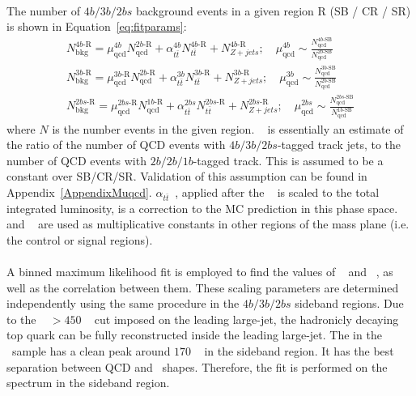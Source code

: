 \paragraph{}
The number of $4b/3b/2bs$ background events in a given region R (SB / CR / SR) is shown in Equation~\ref{eq:fitparams}:
\begin{eqnarray}
\label{eq:fitparams}
N^{4b\text{-R}}_{\text{bkg}} = \mu_{\text{qcd}}^{4b} N^{2b\text{-R}}_{\text{qcd}} + \alpha_{t\bar{t}}^{4b} N^{4b\text{-R}}_{t\bar{t}} + N^{4b\text{-R}}_{Z+jets};
\quad \mu_{\text{qcd}}^{4b} \sim \frac{N^{4b\text{-SB}}_{\text{qcd}}}{N^{2b\text{-SB}}_{\text{qcd}}}
\\
N^{3b\text{-R}}_{\text{bkg}} = \mu_{\text{qcd}}^{3b\text{-R}} N^{2b\text{-R}}_{\text{qcd}} + \alpha_{t\bar{t}}^{3b} N^{3b\text{-R}}_{t\bar{t}} + N^{3b\text{-R}}_{Z+jets} ;
\quad \mu_{\text{qcd}}^{3b} \sim \frac{N^{3b\text{-SB}}_{\text{qcd}}}{N^{2b\text{-SB}}_{\text{qcd}}}\\
N^{2bs\text{-R}}_{\text{bkg}} = \mu_{\text{qcd}}^{2bs\text{-R}} N^{1b\text{-R}}_{\text{qcd}} + \alpha_{t\bar{t}}^{2bs} N^{2bs\text{-R}}_{t\bar{t}} + N^{2bs\text{-R}}_{Z+jets};
\quad \mu_{\text{qcd}}^{2bs} \sim \frac{N^{2bs\text{-SB}}_{\text{qcd}}}{N^{1b\text{-SB}}_{\text{qcd}}}
\end{eqnarray}
where $N$ is the number events in the given region. 
\muqcd~ is essentially an estimate of the ratio of the number of QCD events with $4b/3b/2bs$-tagged track jets, to the number of QCD events with $2b/2b/1b$-tagged track.
This is assumed to be a constant over SB/CR/SR.
Validation of this assumption can be found in Appendix~\ref{AppendixMuqcd}.
$\alpha_{t\bar{t}}$~, applied after the \ttbar~ is scaled to the total integrated luminosity, is a correction to the MC prediction in this phase space.
\muqcd~ and \alphatt~ are used as multiplicative constants in other regions of the mass plane (i.e. the control or signal regions).

\paragraph{}
A binned maximum likelihood fit is employed to find the values of \muqcd~ and \alphatt~, as well as the correlation between them.
These scaling parameters are determined independently using the same procedure in the $4b/3b/2bs$ sideband regions.
Due to the \pt~ $>450$ \GeV~ cut imposed on the leading large-\R jet, the hadronicly decaying top quark can be fully reconstructed inside the leading large-\R jet. 
The \mleadJ in the \ttbar\ sample has a clean peak around $170$ \GeV~ in the sideband region.
It has the best separation between QCD and \ttbar\ shapes.
Therefore, the fit is performed on the \mleadJ spectrum in the sideband region.

